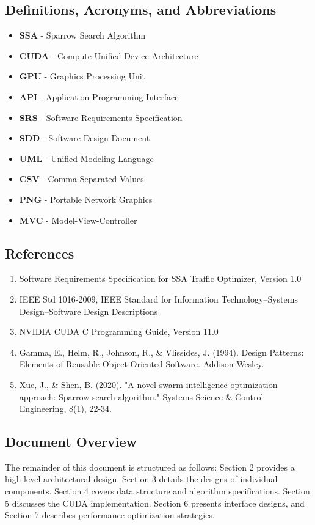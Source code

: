 \documentclass[conference]{IEEEtran}
\begin{document}
\subsection{Definitions, Acronyms, and Abbreviations}
\begin{itemize}
    \item \textbf{SSA} - Sparrow Search Algorithm
    \item \textbf{CUDA} - Compute Unified Device Architecture
    \item \textbf{GPU} - Graphics Processing Unit
    \item \textbf{API} - Application Programming Interface
    \item \textbf{SRS} - Software Requirements Specification
    \item \textbf{SDD} - Software Design Document
    \item \textbf{UML} - Unified Modeling Language
    \item \textbf{CSV} - Comma-Separated Values
    \item \textbf{PNG} - Portable Network Graphics
    \item \textbf{MVC} - Model-View-Controller
\end{itemize}

\subsection{References}
\begin{enumerate}
    \item Software Requirements Specification for SSA Traffic Optimizer, Version 1.0
    \item IEEE Std 1016-2009, IEEE Standard for Information Technology--Systems Design--Software Design Descriptions
    \item NVIDIA CUDA C Programming Guide, Version 11.0
    \item Gamma, E., Helm, R., Johnson, R., \& Vlissides, J. (1994). Design Patterns: Elements of Reusable Object-Oriented Software. Addison-Wesley.
    \item Xue, J., \& Shen, B. (2020). "A novel swarm intelligence optimization approach: Sparrow search algorithm." Systems Science \& Control Engineering, 8(1), 22-34.
\end{enumerate}

\subsection{Document Overview}
The remainder of this document is structured as follows: Section 2 provides a high-level architectural design. Section 3 details the designs of individual components. Section 4 covers data structure and algorithm specifications. Section 5 discusses the CUDA implementation. Section 6 presents interface designs, and Section 7 describes performance optimization strategies.
\end{document}
